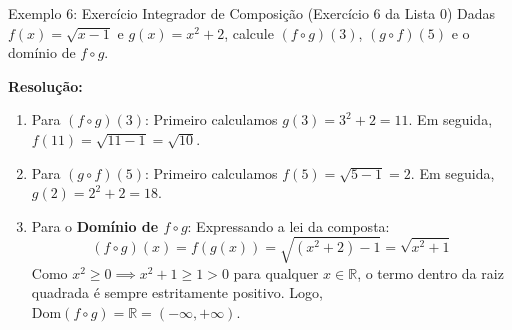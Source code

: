 \documentclass[12pt,a4paper]{article}
\begin{document}
\begin{exemplo}{Exemplo 6: Exercício Integrador de Composição (Exercício 6 da Lista 0)}
    Dadas $f(x) = \sqrt{x-1}$ e $g(x) = x^2 + 2$, calcule $(f \circ g)(3)$, $(g \circ f)(5)$ e o domínio de $f \circ g$.

    \tcblower
    \textbf{Resolução:}
    \begin{enumerate}
        \item Para $(f \circ g)(3)$: Primeiro calculamos $g(3) = 3^2 + 2 = 11$. Em seguida, $f(11) = \sqrt{11-1} = \sqrt{10}$.
        \item Para $(g \circ f)(5)$: Primeiro calculamos $f(5) = \sqrt{5-1} = 2$. Em seguida, $g(2) = 2^2 + 2 = 18$.
        \item Para o \textbf{Domínio de $f \circ g$}: Expressando a lei da composta:
        $$(f \circ g)(x) = f(g(x)) = \sqrt{(x^2 + 2) - 1} = \sqrt{x^2 + 1}$$
        Como $x^2 \ge 0 \implies x^2 + 1 \ge 1 > 0$ para qualquer $x \in \mathbb{R}$, o termo dentro da raiz quadrada é sempre estritamente positivo. Logo, $\text{Dom}(f \circ g) = \mathbb{R} = (-\infty, +\infty)$.
    \end{enumerate}
\end{exemplo}
\end{document}
